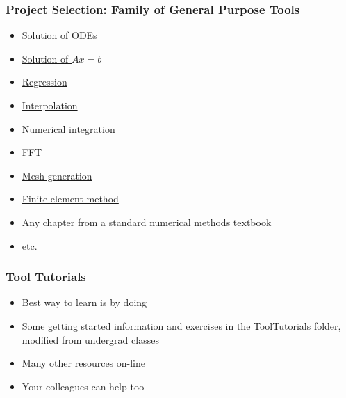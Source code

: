 \documentclass[t,12pt,numbers,fleqn]{beamer}
\begin{document}
\begin{frame}
\frametitle{Project Selection: Family of General Purpose Tools}
\begin{itemize}
\item \href{https://en.wikipedia.org/wiki/Numerical_methods_for_ordinary_differential_equations}{Solution of ODEs}
\item \href{https://en.wikibooks.org/wiki/Numerical_Methods/Solution_of_Linear_Equation_Systems}{Solution of $A x = b$}
\item \href{https://en.wikipedia.org/wiki/Linear_regression}{Regression}
\item \href{https://en.wikibooks.org/wiki/Introduction_to_Numerical_Methods/Interpolation}{Interpolation}
\item \href{https://en.wikipedia.org/wiki/Numerical_integration}{Numerical integration}
\item \href{https://en.wikipedia.org/wiki/Fast_Fourier_transform}{FFT}
\item \href{https://en.wikipedia.org/wiki/Mesh_generation}{Mesh generation}
\item \href{https://en.wikipedia.org/wiki/Finite_element_method}{Finite element method}
\item Any chapter from a standard numerical methods textbook
\item etc.
\end{itemize}
\end{frame}


\begin{frame}
\frametitle{Tool Tutorials}
\begin{itemize}
\item Best way to learn is by doing
\item Some getting started information and exercises in the ToolTutorials
  folder, modified from undergrad classes
\item Many other resources on-line
\item Your colleagues can help too
\end{itemize}
\end{frame}

\end{document}
